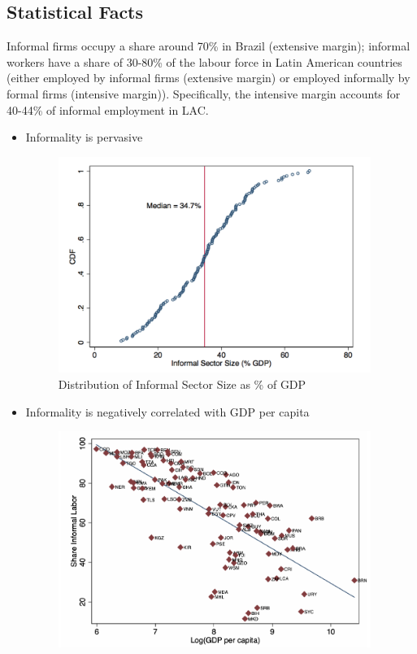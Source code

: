     \subsection{Statistical Facts}
        Informal firms occupy a share around 70\% in Brazil (extensive margin); informal workers have a share of 30-80\% of the labour force in Latin American countries (either employed by informal firms (extensive margin) or employed informally by formal firms (intensive margin)). Specifically, the intensive margin accounts for 40-44\% of informal employment in LAC.\par
        \begin{itemize}
            \item Informality is pervasive
            \begin{figure}[H]
                \centering
                \includegraphics[width=4in]{images/ch5/pervasive_informality.png}
                \caption{Distribution of Informal Sector Size as \% of GDP}
            \end{figure}
            \item Informality is negatively correlated with GDP per capita
            \begin{figure}[H]
                \centering
                \includegraphics[width=4in]{images/ch5/informality and gdp.png}

\end{figure}
\end{itemize}
